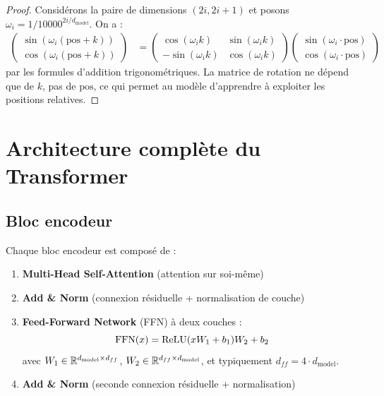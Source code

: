 \begin{proof}
Consid\'erons la paire de dimensions $(2i, 2i+1)$ et posons $\omega_i = 1/10000^{2i/d_{\text{model}}}$. On a :
\begin{align}
\begin{pmatrix} \sin(\omega_i(\text{pos}+k)) \\ \cos(\omega_i(\text{pos}+k)) \end{pmatrix}
&= \begin{pmatrix} \cos(\omega_i k) & \sin(\omega_i k) \\ -\sin(\omega_i k) & \cos(\omega_i k) \end{pmatrix}
\begin{pmatrix} \sin(\omega_i \cdot \text{pos}) \\ \cos(\omega_i \cdot \text{pos}) \end{pmatrix}
\end{align}
par les formules d'addition trigonom\'etriques. La matrice de rotation ne d\'epend que de $k$, pas de $\text{pos}$, ce qui permet au mod\`ele d'apprendre \`a exploiter les positions relatives.
\end{proof}

\section{Architecture compl\`ete du Transformer}
\label{sec:transformer-architecture}

\subsection{Bloc encodeur}
\label{sec:encoder-block}

Chaque bloc encodeur est compos\'e de :
\begin{enumerate}
    \item \textbf{Multi-Head Self-Attention} (attention sur soi-m\^eme)
    \item \textbf{Add \& Norm} (connexion r\'esiduelle + normalisation de couche)
    \item \textbf{Feed-Forward Network} (FFN) \`a deux couches :
    \begin{equation}
    \text{FFN}(x) = \mathrm{ReLU}(xW_1 + b_1)W_2 + b_2
    \end{equation}
    avec $W_1 \in \mathbb{R}^{d_{\text{model}} \times d_{ff}}$, $W_2 \in \mathbb{R}^{d_{ff} \times d_{\text{model}}}$, et typiquement $d_{ff} = 4 \cdot d_{\text{model}}$.
    \item \textbf{Add \& Norm} (seconde connexion r\'esiduelle + normalisation)
\end{enumerate}

